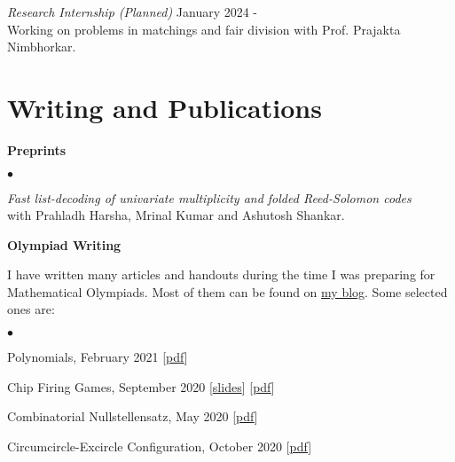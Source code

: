 \documentclass[margin,line, 10pt]{res}
\newenvironment{list2}{
  \begin{list}{$\bullet$}{%
      \setlength{\itemsep}{0in}
      \setlength{\parsep}{0in} \setlength{\parskip}{0in}
      \setlength{\topsep}{0in} \setlength{\partopsep}{0in} 
      \setlength{\leftmargin}{0.2in}}}{\end{list}}
\begin{document}
\begin{resume}
\vspace{-.3cm}
{\em Research Internship (Planned)} \hfill {January 2024 - }\\
Working on problems in matchings and fair division with Prof. Prajakta Nimbhorkar. 
\section{\sc Writing and Publications}


\vspace{-.1cm}

{\bf Preprints}
\begin{list2}
    \item \textit{Fast list-decoding of univariate multiplicity and folded Reed-Solomon codes}\\
     with Prahladh Harsha, Mrinal Kumar and Ashutosh Shankar.
\end{list2}


{\bf Olympiad Writing}

I have written many articles and handouts during the time I was preparing for Mathematical Olympiads. Most of them can be found on \href{https://rgtdfg.blogspot.com/p/handouts.html}{my blog}. Some selected ones are:
\begin{list2}
    \item Polynomials, February 2021 \hfill [\href{https://www.dropbox.com/s/yo31nat6z5ggaue/Polynomials.pdf?dl=0}{pdf}]
    \item Chip Firing Games, September 2020 \hfill [\href{https://www.dropbox.com/s/66a3xw6xad35i8y/chip_firing_presentation.pdf?dl=0}{slides}] [\href{https://www.dropbox.com/s/fu0xmn8u42qdhyl/Chip%20Firing.pdf?dl=0}{pdf}]
    \item Combinatorial Nullstellensatz, May 2020 \hfill [\href{https://www.dropbox.com/s/9vjbqeec17hubov/Combo-Null.pdf?dl=0}{pdf}]
    \item Circumcircle-Excircle Configuration, October 2020 \hfill [\href{https://www.dropbox.com/s/qtxwbpe6tffyyo0/circumex.pdf?dl=0}{pdf}]
\end{list2}



\end{resume}
\end{document}
